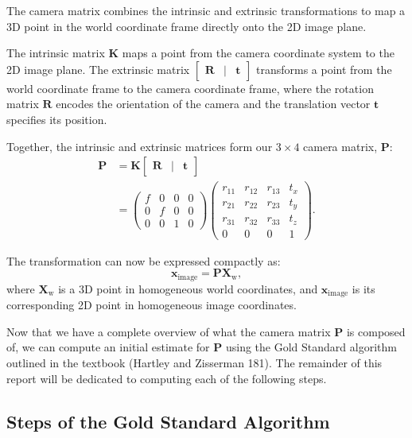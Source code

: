 \documentclass[12pt]{article}
\begin{document}
The camera matrix combines the intrinsic and extrinsic transformations to map a 3D point in the world coordinate frame directly onto the 2D image plane.

The intrinsic matrix $\mathbf{K}$ maps a point from the camera coordinate system to the 2D image plane. The extrinsic matrix $\begin{bmatrix} \mathbf{R} & | & \mathbf{t} \end{bmatrix}$ transforms a point from the world coordinate frame to the camera coordinate frame, where the rotation matrix $\mathbf{R}$ encodes the orientation of the camera and the translation vector $\mathbf{t}$ specifies its position.

Together, the intrinsic and extrinsic matrices form our $3\times 4$ camera matrix, $\mathbf{P}$:
\begin{align*}
    \mathbf{P} &= \mathbf{K} \begin{bmatrix} \mathbf{R} & | & \mathbf{t} \end{bmatrix} \\
    &= \begin{pmatrix}
        f & 0 & 0 & 0 \\
        0 & f & 0 & 0 \\
        0 & 0 & 1 & 0
    \end{pmatrix}
    \begin{pmatrix}
        r_{11} & r_{12} & r_{13} & t_x \\
        r_{21} & r_{22} & r_{23} & t_y \\
        r_{31} & r_{32} & r_{33} & t_z \\
        0 & 0 & 0 & 1
    \end{pmatrix}.
\end{align*}

The transformation can now be expressed compactly as:
$$
\mathbf{x}_{\text{image}} = \mathbf{P} \mathbf{X}_{\text{w}},
$$
where $\mathbf{X}_{\text{w}}$ is a 3D point in homogeneous world coordinates, and $\mathbf{x}_{\text{image}}$ is its corresponding 2D point in homogeneous image coordinates.

Now that we have a complete overview of what the camera matrix \( \mathbf{P} \) is composed of, we can compute an initial estimate for \( \mathbf{P} \) using the Gold Standard algorithm outlined in the textbook (Hartley and Zisserman 181). The remainder of this report will be dedicated to computing each of the following steps.

\subsection{Steps of the Gold Standard Algorithm}
\end{document}

